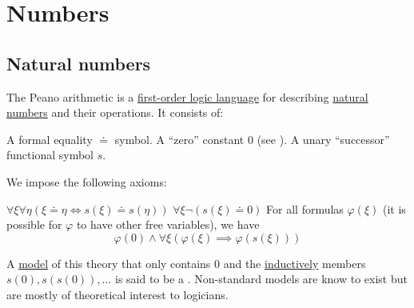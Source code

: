 \section{Numbers}\label{sec:numbers}
\subsection{Natural numbers}\label{subsec:natural_numbers}

\begin{definition}\label{def:peano_arithmetic}
  The Peano arithmetic is a \hyperref[def:first_order_logic_language]{first-order logic language} for describing \hyperref[def:natural_numbers]{natural numbers} and their operations. It consists of:
  \begin{DefEnum}
     A formal equality \( \doteq \) symbol.
     A \enquote{zero} constant \( 0 \) (see ).
     A unary \enquote{successor} functional symbol \( s \).
  \end{DefEnum}

  We impose the following axioms:
  \begin{DefEnum}
     \( \forall \xi \forall \eta (\xi \doteq \eta \iff s(\xi) \doteq s(\eta)) \)
     \( \forall \xi \neg (s(\xi) \doteq 0) \)
     For all formulas \( \varphi(\xi) \) (it is possible for \( \varphi \) to have other free variables), we have
    \begin{equation*}
      \varphi(0) \wedge \forall \xi (\varphi(\xi) \implies \varphi(s(\xi)))
    \end{equation*}
  \end{DefEnum}

  A \hyperref[def:first_order_model]{model} of this theory that only contains \( 0 \) and the \hyperref[remark:induction]{inductively} members \( s(0), s(s(0)), \ldots \) is said to be a . Non-standard models are know to exist but are mostly of theoretical interest to logicians.
\end{definition}



